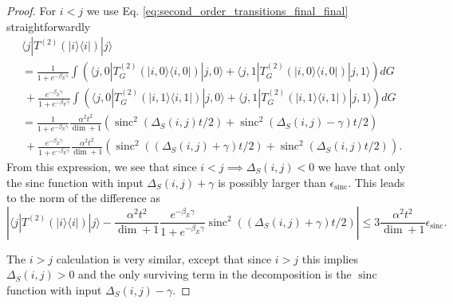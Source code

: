 \documentclass{article}
\newcommand{\ket}[1]{|#1\rangle}
\newcommand{\bra}[1]{\langle #1|}
\newcommand{\ketbra}[2]{| #1\rangle\! \langle #2|}
\newcommand{\parens}[1]{\left( #1 \right)}
\DeclareMathOperator{\sinc}{sinc}
\begin{document}
\begin{proof}
    For $i < j$ we use Eq. \eqref{eq:second_order_transitions_final_final} straightforwardly
    \begin{align}
        &\bra{j} T^{(2)} (\ketbra{i}{i}) \ket{j} \nonumber \\
        &= \frac{1}{1 + e^{-\beta_E \gamma}} \int \parens{\bra{j, 0} T^{(2)}_G(\ketbra{i,0}{i, 0}) \ket{j, 0} + \bra{j, 1} T^{(2)}_G (\ketbra{i, 0}{i ,0}) \ket{j, 1} } dG \nonumber \\
        &~+ \frac{e^{-\beta_E \gamma}}{1 + e^{-\beta_E \gamma}} \int \parens{\bra{j, 0} T^{(2)}_G (\ketbra{i, 1}{i, 1}) \ket{j, 0} + \bra{j, 1} T^{(2)}_G (\ketbra{i, 1}{i, 1}) \ket{j, 1}} dG \\
        &= \frac{1}{1 + e^{-\beta_E \gamma}} \frac{\alpha^2 t^2}{\dim + 1}\parens{\sinc^2(\Delta_S(i, j) t/ 2) + \sinc^2 (\Delta_S(i, j) - \gamma)t /2} \nonumber \\
        &~+ \frac{e^{-\beta_E \gamma}}{1 + e^{-\beta_E \gamma}} \frac{\alpha^2 t^2 }{\dim + 1} \parens{\sinc^2((\Delta_S(i,j) + \gamma) t/ 2) + \sinc^2(\Delta_S(i,j) t/ 2)}.
    \end{align}
    From this expression, we see that since $i < j \implies \Delta_S(i,j) < 0$ we have that only the sinc function with input $\Delta_S(i,j) + \gamma$ is possibly larger than $\epsilon_{\sinc}$. This leads to the norm of the difference as
    \begin{equation}
        \left| \bra{j}T^{(2)}(\ketbra{i}{i})\ket{j} - \frac{\alpha^2 t^2}{\dim + 1} \frac{e^{-\beta_E \gamma}}{1 + e^{-\beta_E \gamma}} \sinc^2 \parens{(\Delta_S(i,j) + \gamma) t/ 2} \right| \leq 3 \frac{\alpha^2 t^2}{\dim + 1} \epsilon_{\sinc}.
    \end{equation}

    The $i > j$ calculation is very similar, except that since $i > j$ this implies $\Delta_S(i,j) > 0$ and the only surviving term in the decomposition is the $\sinc$ function with input $\Delta_S(i,j) - \gamma$.
    

\end{proof}
\end{document}

